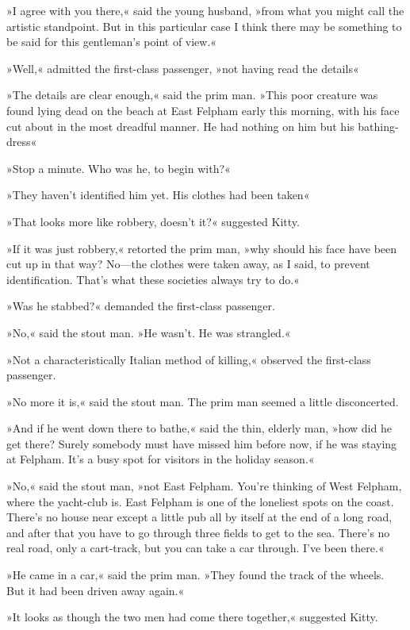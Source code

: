 »I agree with you there,« said the young husband, »from what you might call the artistic standpoint. But in this particular case I think there may be something to be said for this gentleman's point of view.«

»Well,« admitted the first-class passenger, »not having read the details\longdash«

»The details are clear enough,« said the prim man. »This poor creature was found lying dead on the beach at East Felpham early this morning, with his face cut about in the most dreadful manner. He had nothing on him but his bathing-dress\longdash«

»Stop a minute. Who was he, to begin with?«

»They haven't identified him yet. His clothes had been taken\longdash«

»That looks more like robbery, doesn't it?« suggested Kitty.

»If it was just robbery,« retorted the prim man, »why should his face have been cut up in that way? No—the clothes were taken away, as I said, to prevent identification. That's what these societies always try to do.«

»Was he stabbed?« demanded the first-class passenger.

»No,« said the stout man. »He wasn't. He was strangled.«

»Not a characteristically Italian method of killing,« observed the first-class passenger.

»No more it is,« said the stout man. The prim man seemed a little disconcerted.

»And if he went down there to bathe,« said the thin, elderly man, »how did he get there? Surely somebody must have missed him before now, if he was staying at Felpham. It's a busy spot for visitors in the holiday season.«

»No,« said the stout man, »not East Felpham. You're thinking of West Felpham, where the yacht-club is. East Felpham is one of the loneliest spots on the coast. There's no house near except a little pub all by itself at the end of a long road, and after that you have to go through three fields to get to the sea. There's no real road, only a cart-track, but you can take a car through. I've been there.«

»He came in a car,« said the prim man. »They found the track of the wheels. But it had been driven away again.«

»It looks as though the two men had come there together,« suggested Kitty.

